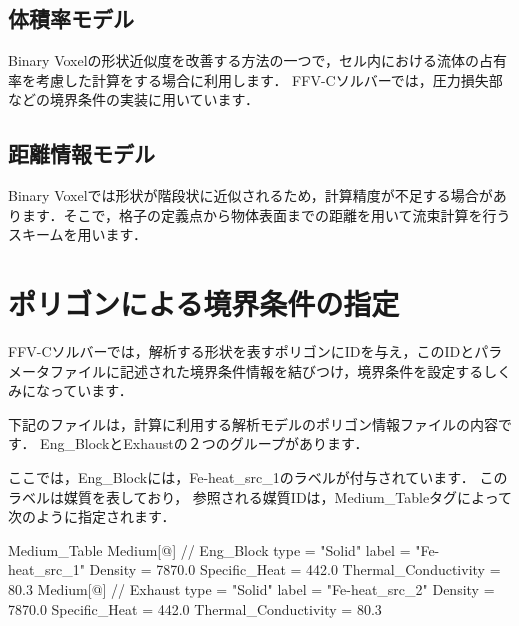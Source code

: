 %
\subsection{体積率モデル}
Binary Voxelの形状近似度を改善する方法の一つで，セル内における流体の占有率を考慮した計算をする場合に利用します．
FFV-Cソルバーでは，圧力損失部などの境界条件の実装に用いています．

%
\subsection{距離情報モデル}
Binary Voxelでは形状が階段状に近似されるため，計算精度が不足する場合があります．そこで，格子の定義点から物体表面までの距離を用いて流束計算を行うスキームを用います．


%
\section{ポリゴンによる境界条件の指定}

FFV-Cソルバーでは，解析する形状を表すポリゴンにIDを与え，このIDとパラメータファイルに記述された境界条件情報を結びつけ，境界条件を設定するしくみになっています．

下記のファイルは，計算に利用する解析モデルのポリゴン情報ファイルの内容です．
Eng\_BlockとExhaustの２つのグループがあります．

{\small
{}
}

\noindent ここでは，Eng\_Blockには，Fe-heat\_src\_1のラベルが付与されています．
このラベルは媒質を表しており，
参照される媒質IDは，Medium\_Tableタグによって次のように指定されます．

{\small
\begin{program}
Medium_Table {
  Medium[@] { // Eng_Block
    type                 = "Solid"
    label                = "Fe-heat_src_1"
    Density              = 7870.0
    Specific_Heat        = 442.0
    Thermal_Conductivity = 80.3
  }
  Medium[@] { // Exhaust
    type                 = "Solid"
    label                = "Fe-heat_src_2"
    Density              = 7870.0
    Specific_Heat        = 442.0
    Thermal_Conductivity = 80.3
  }
}
\end{program}
}

